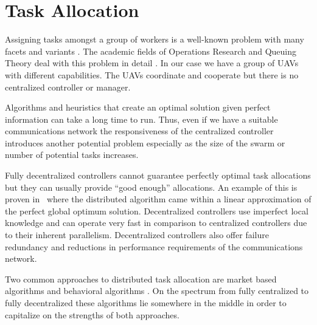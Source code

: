 \section{Task Allocation}
\label{sec:uncoordTaskingRelated}

Assigning tasks amongst a group of workers is a well-known problem with many facets and variants \parencite{hungarian_method, hungarian_tribute, gen_asgn_prob1, gen_asgn_prob2}. The academic fields of Operations Research and Queuing Theory deal with this problem in detail \parencite{queue_theory_book}.  In our case we have a group of UAVs with different capabilities.  The UAVs coordinate and cooperate but there is no centralized controller or manager.   


Algorithms and heuristics that create an optimal solution given perfect information can take a long time to run.  Thus, even if we have a suitable communications network the responsiveness of the centralized controller introduces another potential problem especially as the size of the swarm or number of potential tasks increases. \parencite{heuristic_performance}

Fully decentralized controllers cannot guarantee perfectly optimal task allocations but they can usually provide ``good enough'' allocations.  An example of this is proven in~\textcite{auction_linear_approx} where the distributed algorithm came within a linear approximation of the perfect global optimum solution.  Decentralized controllers use imperfect local knowledge and can operate very fast in comparison to centralized controllers due to their inherent parallelism.  Decentralized controllers also offer failure redundancy and reductions in performance requirements of the communications network.

Two common approaches to distributed task allocation are market based algorithms and behavioral algorithms \parencite{task_alloc_survey}.  On the spectrum from fully centralized to fully decentralized these algorithms lie somewhere in the middle in order to capitalize on the strengths of both approaches.

